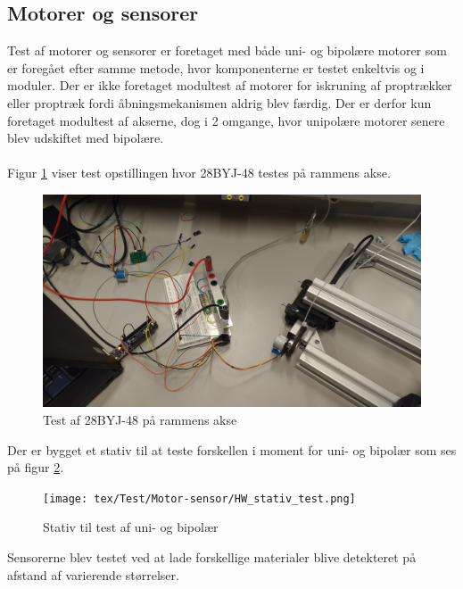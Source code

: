 \subsection{Motorer og sensorer}
Test af motorer og sensorer er foretaget med både uni- og bipolære motorer som er foregået efter samme metode, hvor komponenterne er testet enkeltvis og i moduler. Der er ikke foretaget modultest af motorer for iskruning af proptrækker eller proptræk fordi åbningsmekanismen aldrig blev færdig. Der er derfor kun foretaget modultest af akserne, dog i 2 omgange, hvor unipolære motorer senere blev udskiftet med bipolære.
\\
\\
Figur \ref{fig:HW_bipolar_akse} viser test opstillingen hvor 28BYJ-48 testes på rammens akse.

\begin{figure}[H]
	\includegraphics[scale=0.09]{tex/Test/Motor-sensor/Bipolar_test_opstilling.jpg}
	\caption{Test af 28BYJ-48 på rammens akse}
	\label{fig:HW_bipolar_akse}
\end{figure}

\noindent
Der er bygget et stativ til at teste forskellen i moment for uni- og bipolær som ses på figur \ref{fig:HW_stativ_test}.

\begin{figure}[H]
	\centerline{\texttt{[image: tex/Test/Motor-sensor/HW\_stativ\_test.png]}}
	\caption{Stativ til test af uni- og bipolær}
	\label{fig:HW_stativ_test}
\end{figure}

\noindent
Sensorerne blev testet ved at lade forskellige materialer blive detekteret på afstand af varierende størrelser.
